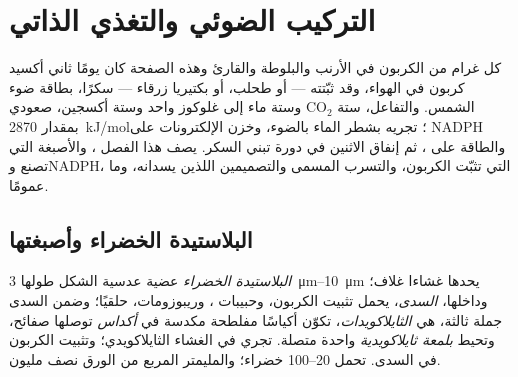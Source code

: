 \chapter{التركيب الضوئي والتغذي الذاتي}\label{ch:b1:photosynthesis}

كل غرام من الكربون في الأرنب والبلوطة والقارئ وهذه الصفحة كان يومًا
ثاني أكسيد كربون في الهواء، وقد ثبّتته  --- أو طحلب، أو بكتيريا
زرقاء --- سكرًا، بطاقة ضوء الشمس. والتفاعل، ستة $\mathrm{CO_2}$ وستة
ماء إلى غلوكوز واحد وستة أكسجين، صعودي بمقدار \qty{2870}{kJ/mol}؛
 تجريه بشطر الماء بالضوء، وخزن الإلكترونات على NADPH والطاقة
على ، ثم إنفاق الاثنين في دورة تبني السكر. يصف هذا الفصل
، والأصبغة  التي تصنع  وNADPH،
 التي تثبّت الكربون، والتسرب المسمى 
والتصميمين اللذين يسدانه، وما  عمومًا.

\section{البلاستيدة الخضراء وأصبغتها}

\begin{definition}\label{def:b1:photosynthesis:chloroplast}
\emph{البلاستيدة الخضراء} عضية عدسية الشكل
طولها \qtyrange{3}{10}{\micro m} يحدها غشاءا غلاف؛ وداخلها،
\emph{السدى}، يحمل  تثبيت الكربون، وحبيبات ،
وريبوزومات،  حلقيًا؛ وضمن السدى جملة  ثالثة، هي
\emph{الثايلاكويدات}، تكوّن أكياسًا مفلطحة مكدسة في
\emph{أكداس} توصلها صفائح، وتحيط \emph{بلمعة ثايلاكويدية} واحدة
متصلة.  تجري في الغشاء الثايلاكويدي؛ وتثبيت
الكربون في السدى.   تحمل \qtyrange{20}{100}{} 
خضراء؛ والمليمتر المربع من الورق نصف مليون.
\end{definition}

